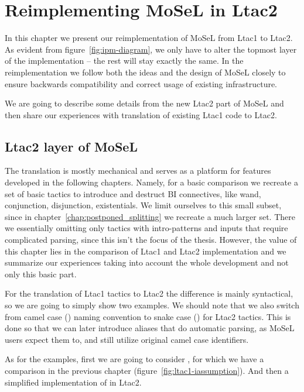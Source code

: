 \chapter{Reimplementing MoSeL in Ltac2}
\label{chap:ltac2-tactics-mosel}

In this chapter we present our reimplementation of MoSeL from Ltac1 to Ltac2.
As evident from figure~\ref{fig:ipm-diagram}, we only have to alter the topmost layer of the implementation -- the rest will stay exactly the same.
In the reimplementation we follow both the ideas and the design of MoSeL closely to ensure backwards compatibility and correct usage of existing infrastructure.

We are going to describe some details from the new Ltac2 part of MoSeL and then share our experiences with translation of existing Ltac1 code to Ltac2.

\section{Ltac2 layer of MoSeL}

The translation is mostly mechanical and serves as a platform for features developed in the following chapters.
Namely, for a basic comparison we recreate a set of basic tactics to introduce and destruct BI connectives, like wand, conjunction, disjunction, existentials.
We limit ourselves to this small subset, since in chapter~\ref{chap:postponed_splitting} we recreate a much larger set.
There we essentially omitting only tactics with intro-patterns and inputs that require complicated parsing, since this isn't the focus of the thesis.
However, the value of this chapter lies in the comparison of Ltac1 and Ltac2 implementation and we summarize our experiences taking into account the whole development and not only this basic part.

For the translation of Ltac1 tactics to Ltac2 the difference is mainly syntactical, so we are going to simply show two examples.
We should note that we also switch from camel case () naming convention to snake case () for Ltac2 tactics.
This is done so that we can later introduce aliases that do automatic parsing, as MoSeL users expect them to, and still utilize original camel case identifiers.

As for the examples, first we are going to consider , for which we have a comparison in the previous chapter (figure~\ref{fig:ltac1-iassumption}).
And then a simplified implementation of  in Ltac2.

